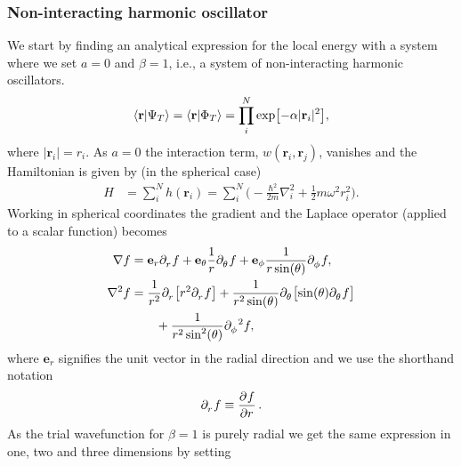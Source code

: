 \documentclass[
    a4paper, aps, twocolumn, floatfix, superscriptaddress]{revtex4-1}
\newcommand{\vf}{\mathbf}
\newcommand{\1}{\mathds{1}}
\newcommand{\tpl}[1]{\tensor{\partial}{_#1}} %
\newcommand{\half}{\frac{1}{2}}
\begin{document}
        \subsubsection{Non-interacting harmonic oscillator}
            We start by finding an analytical expression for the local energy
            with a system where we set $a = 0$ and $\beta = 1$, i.e., a system
            of non-interacting harmonic oscillators.
            \begin{align}
                \bra{\vf{r}}\ket{\Psi_T}
                = \bra{\vf{r}}\ket{\Phi_T}
                = \prod_i^N \exp\bigl[
                    -\alpha |\vf{r}_i|^2
                \bigr],
            \end{align}
            where $|\vf{r}_i| = r_i$. As $a = 0$ the interaction term,
            $w(\vf{r}_i, \vf{r}_j)$, vanishes and the Hamiltonian is given by
            (in the spherical case)
            \begin{align}
                H &= \sum_i^N h(\vf{r}_i)
                = \sum_i^N \biggl(
                    -\frac{\hbar^2}{2m}\nabla_i^2
                    + \half m \omega^2 r_i^2
                \biggr).
            \end{align}
            Working in spherical coordinates the gradient and the Laplace
            operator (applied to a scalar function) becomes
            \begin{align}
                \nabla f
                &= \vf{e}_r\tpl{r}f
                + \vf{e}_{\theta}\frac{1}{r}\tpl{\theta}f
                + \vf{e}_{\phi}\frac{1}{r\sin(\theta)}\tpl{\phi}f, \\
                \nabla^2 f
                &= \frac{1}{r^2}\tpl{r}
                \bigl[
                    r^2\tpl{r}f
                \bigr]
                + \frac{1}{r^2\sin(\theta)}\tpl{\theta}
                \bigl[
                    \sin(\theta)\tpl{\theta}f
                \bigr] \nonumber\\
                &\qquad
                + \frac{1}{r^2\sin^2(\theta)}\tpl{\phi}^2f,
            \end{align}
            where $\vf{e}_r$ signifies the unit vector in the radial direction
            and we use the shorthand notation
            \begin{align}
                \tpl{r}f \equiv \dpd[]{f}{r}.
            \end{align}
            As the trial wavefunction for $\beta = 1$ is purely radial we get
            the same expression in one, two and three dimensions by setting
\end{document}
